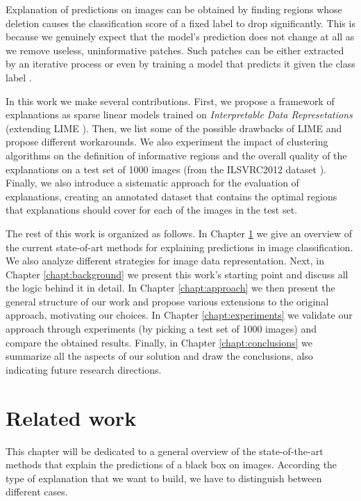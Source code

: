 \documentclass[12pt, twoside, a4paper]{report}
\newcommand{\whitepage}{\clearpage
						\thispagestyle{empty}
						\phantom{a}
						\vfill}
\begin{document}
Explanation of predictions on images can be obtained by finding regions whose deletion causes the classification score of a fixed label to drop significantly. This is because we genuinely expect that the model's prediction does not change at all as we remove useless, uninformative patches. 
Such patches can be either extracted by an iterative process or even by training a model that predicts it given the class label \cite{real_time_image_saliency}. 

\bigskip

In this work we make several contributions. First, we propose a framework of explanations as sparse linear models trained on \textit{Interpretable Data Represetations} (extending LIME \cite{lime}). Then, we list some of the possible drawbacks of LIME and propose different workarounds. We also experiment the impact of clustering algorithms on the definition of informative regions and the overall quality of the explanations on a test set of 1000 images (from the ILSVRC2012 dataset \cite{ilsvrc}). 
Finally, we also introduce a sistematic approach for the evaluation of explanations, creating an annotated dataset that contains the optimal regions that explanations should cover for each of the images in the test set.

The rest of this work is organized as follows. In Chapter \ref{chapt:related-work} we give an overview of the current state-of-art methods for explaining predictions in image classification. We also analyze different strategies for image data representation. Next, in Chapter \ref{chapt:background} we present this work's starting point and discuss all the logic behind it in detail. In Chapter \ref{chapt:approach} we then present the general structure of our work and propose various extensions to the original approach, motivating our choices. In Chapter \ref{chapt:experiments} we validate our approach through experiments (by picking a test set of 1000 images) and compare the obtained results. Finally, in Chapter \ref{chapt:conclusions} we summarize all the aspects of our solution and draw the conclusions, also indicating future research directions.

\whitepage


\chapter{Related work}\label{chapt:related-work}

This chapter will be dedicated to a general overview of the state-of-the-art methods that explain the predictions of a black box on images. According the type of explanation that we want to build, we have to distinguish between different cases. 
\end{document}
